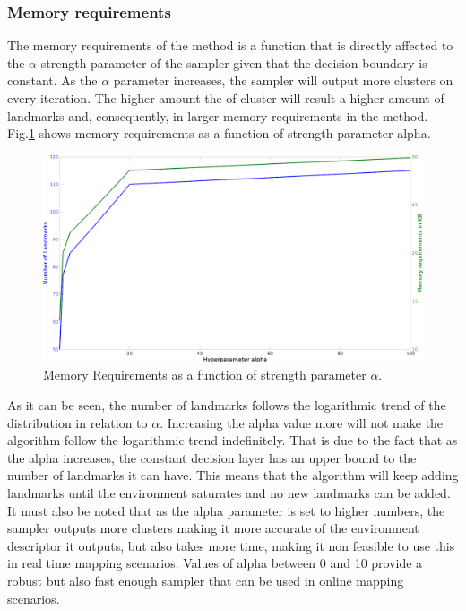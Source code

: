 \documentclass[twoside,hidelinks]{article}
\begin{document}
\subsubsection{Memory requirements}

The memory requirements of the method is a function that is directly affected to the $\alpha$ strength parameter of the sampler given that the decision boundary is constant. As the $\alpha$ parameter increases, the sampler will output more clusters on every iteration. The higher amount the of cluster will result a higher amount of landmarks and, consequently, in larger memory requirements in the method. Fig.\ref{pcl:kl} shows memory requirements as a function of strength parameter alpha.


\begin{figure}[h!]
  \centering
    \includegraphics[width=.8\textwidth]{memoryRequirements2}
    \caption{Memory Requirements as a function of strength parameter $\alpha$.}
  \label{pcl:kl}
\end{figure}

As it can be seen, the number of landmarks follows the logarithmic trend of the distribution in relation to $\alpha$. Increasing the alpha value more will not make the algorithm follow the logarithmic trend indefinitely. That is due to the fact that as the alpha increases, the constant decision layer has an upper bound to the number of landmarks it can have. This means that the algorithm will keep adding landmarks until the environment saturates and no new landmarks can be added. It must also be noted that as the alpha parameter is set to higher numbers, the sampler outputs more clusters making it more accurate of the environment descriptor it outputs, but also takes more time, making it non feasible to use this in real time mapping scenarios. Values of alpha between 0 and 10 provide a robust but also fast enough sampler that can be used in online mapping scenarios.
\end{document}
